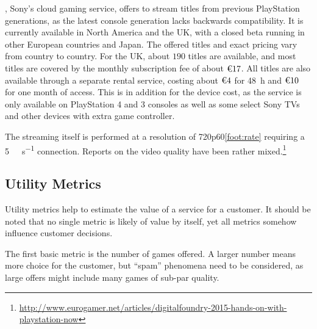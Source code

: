 
\psnow, Sony's cloud gaming service, offers to stream titles from previous
PlayStation generations, as the latest console generation lacks
backwards compatibility. It is currently available in North America and
the UK, with a closed beta running in other European countries and
Japan. The offered titles and exact pricing vary from country to
country. For the UK, about $190$ titles are available, and most titles
are covered by the monthly subscription fee of about $\text{\texteuro}
17$. All titles are also available through a separate rental service,
costing about $\text{\texteuro} 4$ for \SI{48}{\hour} and
$\text{\texteuro} 10$ for one month of access. This is in addition for
the device cost, as the service is only available on PlayStation 4 and 3
consoles as well as some select Sony TVs and other devices with extra
game controller.


The streaming itself is performed at a resolution of
720p60\cref{foot:rate} requiring a \SI{5}{\mega\bit\per\second}
connection. Reports on the video quality have been rather
mixed.\footnote{\url{http://www.eurogamer.net/articles/digitalfoundry-2015-hands-on-with-playstation-now}}






\subsection{Utility Metrics}

Utility metrics help to estimate the value of a service for a customer.
It should be noted that no single metric is likely of value by itself,
yet all metrics somehow influence customer decisions.

The first basic metric is the number of games offered. A larger number
means more choice for the customer, but ``spam'' phenomena need to
be considered, as large offers might include many games of sub-par quality.

